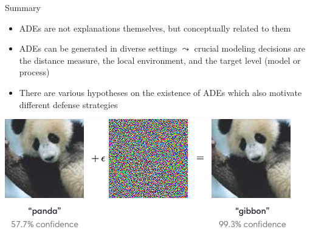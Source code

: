 \documentclass[10pt,compress,t,notes=noshow, xcolor=table]{beamer}
\begin{document}

\begin{frame}[c]{Summary}
\begin{itemize}
    \item ADEs are not explanations themselves, but conceptually related to them
    \item ADEs can be generated in diverse settings $\leadsto$ crucial modeling decisions are the distance measure, the local environment, and the target level (model or process)
    \item There are various hypotheses on the existence of ADEs which also motivate different defense strategies
\end{itemize}
\begin{center}
    \includegraphics[width = .6\textwidth]{figure/AEpanda_simple.png}
    
    {}
\end{center}
\end{frame}
\end{document}
